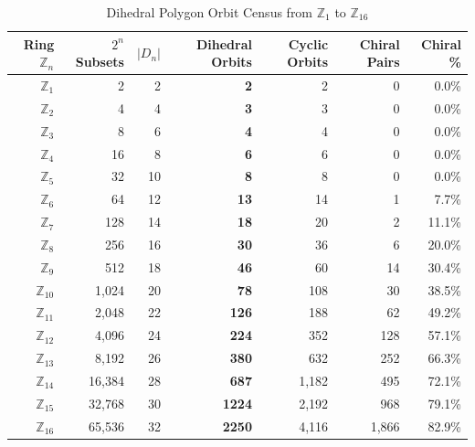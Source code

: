 \begin{table}[htbp]
\centering\small
\caption{\label{tab:poly-census-summary}Dihedral Polygon Orbit Census from $\mathbb{Z}_1$ to $\mathbb{Z}_{16}$}
\begin{tabular}{r | r r | r r | r r}
\toprule
Ring $\mathbb{Z}_n$ & $2^n$ Subsets & $|D_n|$ & Dihedral Orbits & Cyclic Orbits & Chiral Pairs & Chiral \% \\
\midrule
$\mathbb{Z}_{1}$ & 2 & 2 & \textbf{2} & 2 & 0 & 0.0\% \\
$\mathbb{Z}_{2}$ & 4 & 4 & \textbf{3} & 3 & 0 & 0.0\% \\
$\mathbb{Z}_{3}$ & 8 & 6 & \textbf{4} & 4 & 0 & 0.0\% \\
$\mathbb{Z}_{4}$ & 16 & 8 & \textbf{6} & 6 & 0 & 0.0\% \\
$\mathbb{Z}_{5}$ & 32 & 10 & \textbf{8} & 8 & 0 & 0.0\% \\
$\mathbb{Z}_{6}$ & 64 & 12 & \textbf{13} & 14 & 1 & 7.7\% \\
$\mathbb{Z}_{7}$ & 128 & 14 & \textbf{18} & 20 & 2 & 11.1\% \\
$\mathbb{Z}_{8}$ & 256 & 16 & \textbf{30} & 36 & 6 & 20.0\% \\
$\mathbb{Z}_{9}$ & 512 & 18 & \textbf{46} & 60 & 14 & 30.4\% \\
$\mathbb{Z}_{10}$ & 1,024 & 20 & \textbf{78} & 108 & 30 & 38.5\% \\
$\mathbb{Z}_{11}$ & 2,048 & 22 & \textbf{126} & 188 & 62 & 49.2\% \\
$\mathbb{Z}_{12}$ & 4,096 & 24 & \textbf{224} & 352 & 128 & 57.1\% \\
$\mathbb{Z}_{13}$ & 8,192 & 26 & \textbf{380} & 632 & 252 & 66.3\% \\
$\mathbb{Z}_{14}$ & 16,384 & 28 & \textbf{687} & 1,182 & 495 & 72.1\% \\
$\mathbb{Z}_{15}$ & 32,768 & 30 & \textbf{1224} & 2,192 & 968 & 79.1\% \\
$\mathbb{Z}_{16}$ & 65,536 & 32 & \textbf{2250} & 4,116 & 1,866 & 82.9\% \\
\bottomrule
\end{tabular}
\end{table}
